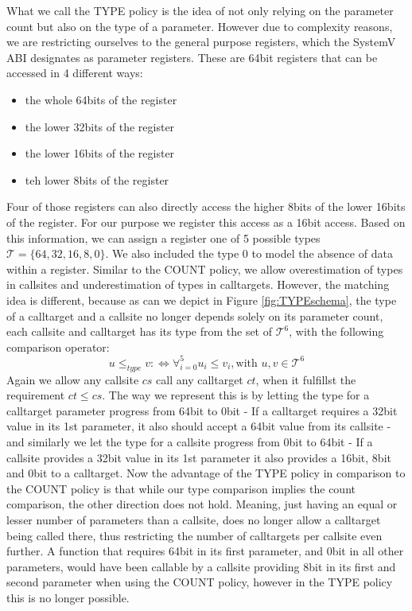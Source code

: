 What we call the TYPE policy is the idea of not only relying on the parameter count but also on the type of a parameter. However due to complexity reasons, we are restricting ourselves to the general purpose registers, which the SystemV ABI designates as parameter registers.
These are 64bit registers that can be accessed in 4 different ways:
\begin{itemize}
\item the whole 64bits of the register
\item the lower 32bits of the register
\item the lower 16bits of the register
\item teh lower 8bits of the register
\end{itemize}
Four of those registers can also directly access the higher 8bits of the lower 16bits of the register. For our purpose we register this access as a 16bit access. Based on this information, we can assign a register one of 5 possible types $\mathcal{T} = \{64, 32, 16, 8, 0\}$. We also included the type 0 to model the absence of data within a register. Similar to the COUNT policy, we allow overestimation of types in callsites and underestimation of types in calltargets. However, the matching idea is different, because as can we depict in Figure \ref{fig:TYPEschema}, the type of a calltarget and a callsite no longer depends solely on its parameter count, each callsite and calltarget has its type from the set of $\mathcal{T}^6$, with the following comparison operator:
\[
	u \leq_{type} v :\Longleftrightarrow  \forall_{i = 0}^{5} {u_i \leq v_i} , \text {with } u, v \in \mathcal{T}^6
\]
Again we allow any callsite $cs$ call any calltarget $ct$, when it fulfillst the requirement $ct \leq cs$. The way we represent this is by letting the type for a calltarget parameter progress from 64bit to 0bit - If a calltarget requires a 32bit value in its 1st parameter, it also should accept a 64bit value from its callsite - and similarly we let the type for a callsite progress from 0bit to 64bit - If a callsite provides a 32bit value in its 1st parameter it also provides a 16bit, 8bit and 0bit to a calltarget. Now the advantage of the TYPE policy in comparison to the COUNT policy is that while our type comparison implies the count comparison, the other direction does not hold. Meaning, just having an equal or lesser number of parameters than a callsite, does no longer allow a calltarget being called there, thus restricting the number of calltargets per callsite even further. A function that requires 64bit in its first parameter, and 0bit in all other parameters, would have been callable by a callsite providing 8bit in its first and second parameter when using the COUNT policy, however in the TYPE policy this is no longer possible.


